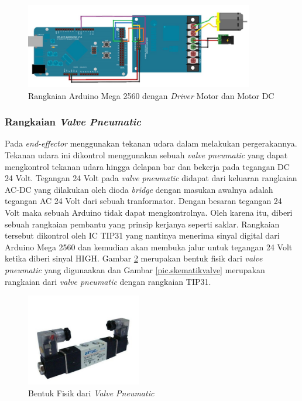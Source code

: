 \begin{figure}[H]
	\centering
	\includegraphics[width=10cm]{gambar/drivermotor.jpg}
	\caption{Rangkaian Arduino Mega 2560 dengan \textit{Driver} Motor dan Motor DC}
	\label{pic.motordcdriver}
\end{figure}
\subsubsection{Rangkaian \textit{Valve Pneumatic}}
Pada \textit{end-effector} menggunakan tekanan udara dalam melakukan pergerakannya. Tekanan udara ini dikontrol menggunakan sebuah \textit{valve pneumatic} yang dapat mengkontrol tekanan udara hingga delapan bar dan bekerja pada tegangan DC 24 Volt. Tegangan 24 Volt pada \textit{valve pneumatic} didapat dari keluaran rangkaian AC-DC yang dilakukan oleh dioda \textit{bridge} dengan masukan awalnya adalah tegangan AC 24 Volt dari sebuah tranformator. Dengan besaran tegangan 24 Volt maka sebuah Arduino tidak dapat mengkontrolnya. Oleh karena itu, diberi sebuah rangkaian pembantu yang prinsip kerjanya seperti saklar. Rangkaian tersebut dikontrol oleh IC TIP31 yang nantinya  menerima sinyal digital dari Arduino Mega 2560 dan kemudian akan membuka jalur untuk tegangan 24 Volt ketika diberi sinyal HIGH. Gambar \ref{pic.fisikvalve} merupakan bentuk fisik dari \textit{valve pneumatic} yang digunaakan dan Gambar \ref{pic.skematikvalve} merupakan rangkaian dari \textit{valve pneumatic} dengan rangkaian TIP31.
\begin{figure}[H]
	\centering
	\includegraphics[width=5cm]{gambar/relay.jpg}
	\caption{Bentuk Fisik dari \textit{Valve Pneumatic}}
	\label{pic.fisikvalve}
\end{figure}
